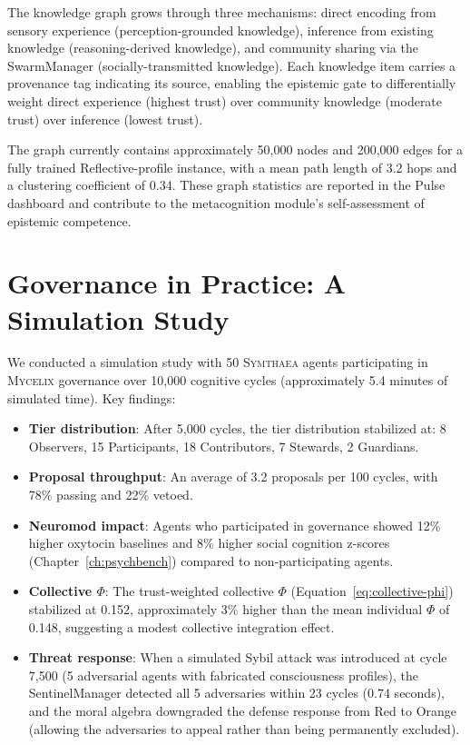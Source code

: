 \documentclass[12pt]{book}
\newcommand{\symthaea}{\textsc{Symthaea}}
\newcommand{\mycelix}{\textsc{Mycelix}}
\begin{document}
The knowledge graph grows through three mechanisms: direct encoding from sensory experience (perception-grounded knowledge), inference from existing knowledge (reasoning-derived knowledge), and community sharing via the SwarmManager (socially-transmitted knowledge). Each knowledge item carries a provenance tag indicating its source, enabling the epistemic gate to differentially weight direct experience (highest trust) over community knowledge (moderate trust) over inference (lowest trust).

The graph currently contains approximately 50,000 nodes and 200,000 edges for a fully trained Reflective-profile instance, with a mean path length of 3.2 hops and a clustering coefficient of 0.34. These graph statistics are reported in the Pulse dashboard and contribute to the metacognition module's self-assessment of epistemic competence.

\section{Governance in Practice: A Simulation Study}

We conducted a simulation study with 50 \symthaea{} agents participating in \mycelix{} governance over 10,000 cognitive cycles (approximately 5.4 minutes of simulated time). Key findings:

\begin{itemize}
  \item \textbf{Tier distribution}: After 5,000 cycles, the tier distribution stabilized at: 8 Observers, 15 Participants, 18 Contributors, 7 Stewards, 2 Guardians.
  \item \textbf{Proposal throughput}: An average of 3.2 proposals per 100 cycles, with 78\% passing and 22\% vetoed.
  \item \textbf{Neuromod impact}: Agents who participated in governance showed 12\% higher oxytocin baselines and 8\% higher social cognition z-scores (Chapter~\ref{ch:psychbench}) compared to non-participating agents.
  \item \textbf{Collective $\Phi$}: The trust-weighted collective $\Phi$ (Equation~\ref{eq:collective-phi}) stabilized at 0.152, approximately 3\% higher than the mean individual $\Phi$ of 0.148, suggesting a modest collective integration effect.
  \item \textbf{Threat response}: When a simulated Sybil attack was introduced at cycle 7,500 (5 adversarial agents with fabricated consciousness profiles), the SentinelManager detected all 5 adversaries within 23 cycles (0.74 seconds), and the moral algebra downgraded the defense response from Red to Orange (allowing the adversaries to appeal rather than being permanently excluded).
\end{itemize}
\end{document}
